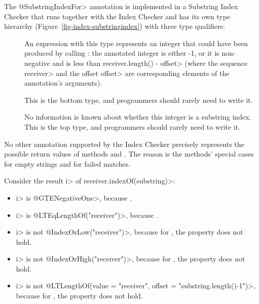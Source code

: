 The \<@SubstringIndexFor> annotation is implemented in a Substring Index
Checker that runs together with the Index Checker and has its own type
hierarchy (Figure~\ref{fig-index-substringindex}) with three type
qualifiers:
\begin{description}
\item[]
  An expression with this type represents an integer that could have been
  produced by calling
  :
  the annotated integer is either -1, or it is non-negative and is less
  than \<receiver.length() - offset> (where the sequence
  \<receiver> and the offset \<offset> are corresponding elements of the
  annotation's arguments).
\item[]
  This is the bottom type, and programmers should rarely need to write it.
\item[]
  No information is known about whether this integer is a substring index.
  This is the top type, and programmers should rarely need to write it.
\end{description}



No other annotation supported by the Index Checker precisely represents the
possible return values of methods
and
.
The reason is the methods' special cases for empty strings and for failed matches.

Consider the result \<i> of \<receiver.indexOf(substring)>:

\begin{itemize}
\item
  \<i> is \<@GTENegativeOne>, because .
\item
  \<i> is \<@LTEqLengthOf("receiver")>, because .
\item
  \<i> is not \<@IndexOrLow("receiver")>, because for
  , the property
   does not hold.
\item
  \<i> is not \<@IndexOrHigh("receiver")>, because for
  , the property
   does not hold.
\item
  \<i> is not
  \<@LTLengthOf(value = "receiver", offset = "substring.length()-1")>,
  because for , the property
   does not hold.
\end{itemize}

